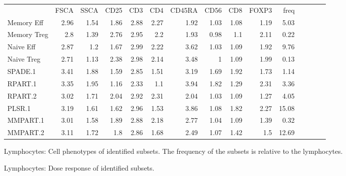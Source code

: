 
\begin{table}[h]\footnotesize
\centering
\begin{tabular}{lrrrrrrrrrrrrrr}
\rowcolor{Gray}
            & FSCA & SSCA & CD25 & CD3  & CD4  & CD45RA & CD56 & CD8  & FOXP3 & freq \\
Memory Eff  & 2.96 & 1.54 & 1.86 & 2.88 & 2.27 & 1.92 & 1.03 & 1.08 & 1.19 & 5.03 \\
Memory Treg & 2.8  & 1.39 & 2.76 & 2.95 & 2.2  & 1.93 & 0.98 & 1.1  & 2.11 & 0.22 \\
Naive Eff   & 2.87 & 1.2  & 1.67 & 2.99 & 2.22 & 3.62 & 1.03 & 1.09 & 1.92 & 9.76 \\
Naive Treg  & 2.71 & 1.13 & 2.38 & 2.98 & 2.14 & 3.48 & 1    & 1.09 & 1.99 & 0.13 \\
\hline
SPADE.1     & 3.41 & 1.88 & 1.59 & 2.85 & 1.51 & 3.19 & 1.69 & 1.92 & 1.73 & 1.14 \\
RPART.1     & 3.35 & 1.95 & 1.16 & 2.33 & 1.1  & 3.94 & 1.82 & 1.29 & 2.31 & 3.36 \\
RPART.2     & 3.02 & 1.71 & 2.04 & 2.92 & 2.31 & 2.04 & 1.03 & 1.09 & 1.27 & 4.05 \\
PLSR.1      & 3.19 & 1.61 & 1.62 & 2.96 & 1.53 & 3.86 & 1.08 & 1.82 & 2.27 & 15.08 \\
MMPART.1    & 3.01 & 1.58 & 1.89 & 2.88 & 2.18 & 2.77 & 1.04 & 1.09 & 1.39 & 0.32 \\
MMPART.2    & 3.11 & 1.72 & 1.8  & 2.86 & 1.68 & 2.49 & 1.07 & 1.42 & 1.5  & 12.69 \\
\end{tabular}
{ Lymphocytes: Cell phenotypes of identified subsets. }
{ The frequency of the subsets is relative to the lymphocytes. }
\end{table}

{ Lymphocytes: Dose response of identified subsets. }
{ }


